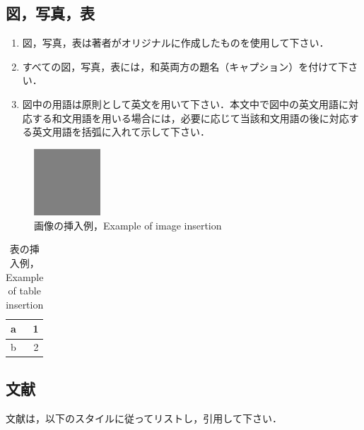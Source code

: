 \subsection{図，写真，表}
\begin{enumerate}
  \item{図，写真，表は著者がオリジナルに作成したものを使用して下さい．}
  \item{すべての図，写真，表には，和英両方の題名（キャプション）を付けて下さい．}
  \item{図中の用語は原則として英文を用いて下さい．本文中で図中の英文用語に対応する和文用語を用いる場合には，必要に応じて当該和文用語の後に対応する英文用語を括弧に入れて示して下さい．}
\end{enumerate}

\begin{figure}[htbp]
\centering
\includegraphics[width=25mm]{gray.jpg}
\caption{画像の挿入例，Example of image insertion}
\end{figure}

\begin{table}[htbp]
\caption{表の挿入例，Example of table insertion}
\begin{center}
\begin{tabular}{|l|r|} \hline
a & 1 \\ \hline
b & 2 \\ \hline
 \end{tabular}
 \end{center}
 \end{table}
 
\subsection{文献}
文献は，以下のスタイルに従ってリストし，引用して下さい． 
